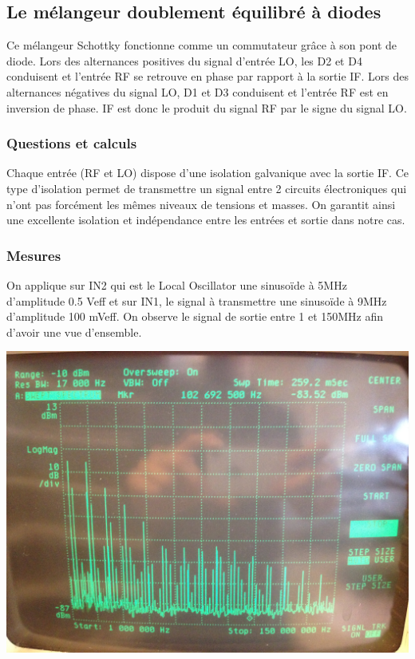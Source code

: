 \documentclass{article}
\begin{document}
%
%
%


\subsection{Le mélangeur doublement équilibré à diodes}

Ce mélangeur Schottky fonctionne comme un commutateur grâce à son pont de diode. Lors des alternances positives du signal d'entrée LO,  les D2 et D4 conduisent  et l'entrée RF se retrouve en phase  par rapport à la sortie IF. Lors des alternances négatives du signal LO, D1 et D3 conduisent et l'entrée RF est en inversion de phase. IF est donc le produit du signal RF par le signe du signal LO.

\subsubsection{Questions et calculs}


Chaque entrée (RF et LO) dispose d'une isolation galvanique avec la sortie IF. Ce type d'isolation permet de transmettre un signal entre 2 circuits électroniques qui n'ont pas forcément les mêmes niveaux de tensions et masses. On garantit ainsi une excellente isolation et indépendance entre les entrées et sortie dans notre cas.

\subsubsection{Mesures}


On applique sur IN2 qui est le Local Oscillator une sinusoïde à 5MHz d’amplitude  0.5 Veff  et sur IN1, le signal à transmettre une sinusoïde à 9MHz d'amplitude 100 mVeff.
On observe le signal de sortie entre 1 et 150MHz afin d'avoir une vue d'ensemble.

\begin{center}
\includegraphics[width=0.7\linewidth]{9_3_1.jpg}
\end{center}
\end{document}
